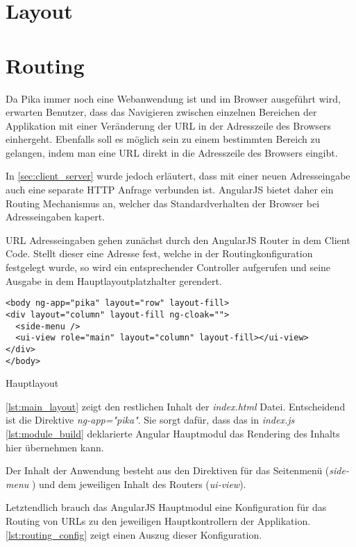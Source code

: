 \section{Layout}

\section{Routing}

Da Pika immer noch eine Webanwendung ist und im Browser ausgeführt wird, erwarten Benutzer, dass das Navigieren zwischen einzelnen Bereichen der Applikation mit einer Veränderung der URL in der Adresszeile des Browsers einhergeht. Ebenfalls soll es möglich sein zu einem bestimmten Bereich zu gelangen, indem man eine URL direkt in die Adresszeile des Browsers eingibt.

In \ref{sec:client_server} wurde jedoch erläutert, dass mit einer neuen Adresseingabe auch eine separate HTTP Anfrage verbunden ist. AngularJS bietet daher ein Routing Mechanismus an, welcher das Standardverhalten der Browser bei Adresseingaben kapert. 

URL Adresseingaben gehen zunächst durch den AngularJS Router in dem Client Code. Stellt dieser eine Adresse fest, welche in der Routingkonfiguration festgelegt wurde, so wird ein entsprechender Controller aufgerufen und seine Ausgabe in dem Hauptlayoutplatzhalter gerendert. 


\begin{listing}[H]
\begin{verbatim}
<body ng-app="pika" layout="row" layout-fill>
<div layout="column" layout-fill ng-cloak="">
  <side-menu />
  <ui-view role="main" layout="column" layout-fill></ui-view>
</div>
</body>
\end{verbatim}
\caption{Hauptlayout}
\label{lst:main_layout}
\end{listing}

\ref{lst:main_layout} zeigt den restlichen Inhalt der \textit{index.html} Datei. Entscheidend ist die Direktive \textit{ng-app="pika"}. Sie sorgt dafür, dass das in \textit{index.js} \ref{lst:module_build} deklarierte Angular Hauptmodul das Rendering des Inhalts hier übernehmen kann.

Der Inhalt der Anwendung besteht aus den Direktiven für das Seitenmenü (\textit{side-menu} ) und dem jeweiligen Inhalt des Routers (\textit{ui-view}). 

Letztendlich brauch das AngularJS Hauptmodul eine Konfiguration für das Routing von URLs zu den jeweiligen Hauptkontrollern der Applikation. \ref{lst:routing_config} zeigt einen Auszug dieser  
Konfiguration.

